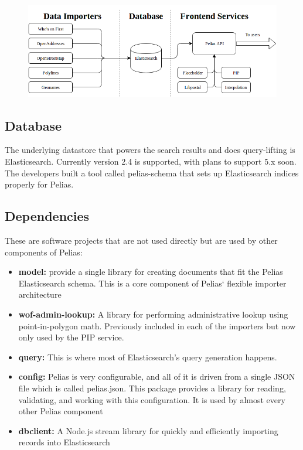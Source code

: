 \begin{figure}[H]
\centering
\includegraphics[width=1.0\textwidth]{img/pelias_architecture}
\label{fig:pelias_architecture}
\end{figure}

\subsection{Database}
The underlying datastore that powers the search results and does query-lifting is Elasticsearch. Currently version 2.4 is supported, with plans to support 5.x soon. The developers built a tool called pelias-schema that sets up Elasticsearch indices properly for Pelias.

\subsection{Dependencies}
These are software projects that are not used directly but are used by other components of Pelias:
\begin{itemize}
\item \textbf{model:} provide a single library for creating documents that fit the Pelias Elasticsearch schema. This is a core component of Pelias‘ flexible importer architecture
\item \textbf{wof-admin-lookup:} A library for performing administrative lookup using point-in-polygon math. Previously included in each of the importers but now only used by the PIP service.
\item \textbf{query:} This is where most of Elasticsearch’s query generation happens.
\item \textbf{config:} Pelias is very configurable, and all of it is driven from a single JSON file which is called pelias.json. This package provides a library for reading, validating, and working with this configuration. It is used by almost every other Pelias component
\item \textbf{dbclient:} A Node.js stream library for quickly and efficiently importing records into Elasticsearch
\end{itemize}


